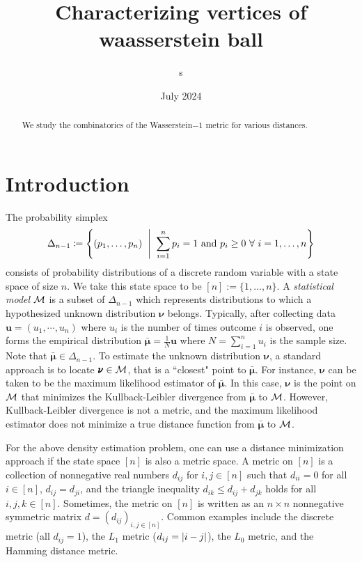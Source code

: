 

\usepackage[
backend=biber,
style=alphabetic,giveninits,
citestyle=ieee-alphabetic,
natbib=true,
uniquelist=false,
maxnames=10,
sorting=ynt
]{biblatex}
%


\title{Characterizing vertices of waasserstein ball}
\author{s}
\date{July 2024}



\begin{abstract}
We study the combinatorics of the Wasserstein$-1$ metric for various distances.
\end{abstract}
\maketitle

\section{Introduction}
The probability simplex 
$$ \Delta_{n-1}  \sett \set{(p_1, \ldots, p_n) \st \sum_{i=1}^n p_i = 1 \text{ and } p_i \geq 0 \fa i=1, \ldots,n }$$
consists of probability distributions of a discrete random variable with a state space of size $n$. We  take this state space to be $[n] := \{1, \ldots, n\}$. A {\it statistical model} ${\mathcal{M}}$ is a subset of $\Delta_{n-1}$ which represents distributions to which a hypothesized unknown distribution $\pmb\nu$ belongs. Typically, after collecting data $\pmb u=(u_1, \cdots, u_n)$ where $u_i$ is the number of times outcome $i$ is observed, one forms 
the empirical distribution $\bar{\pmb \mu} = \frac{1}{N} \pmb u$  where $ N = \sum\limits_{i=1}^n u_i$ is the sample size. Note that $\bar{\pmb \mu} \in \Delta_{n-1}$. To estimate the unknown distribution $\pmb \nu$, a standard approach is to locate $\pmb \nu \in {\mathcal{M}}$, that is a ``closest" point to $\bar {\pmb\mu}$. For instance, $\pmb\nu$ can be taken to be the maximum likelihood estimator \cite[Chapter 7]{sullivant2018algstat} of $\bar{\pmb \mu}$. In this case, $\pmb \nu$ is the point on ${\mathcal{M}}$ that minimizes the Kullback-Leibler divergence from $\bar{\pmb \mu}$ to ${\mathcal{M}}$. However, Kullback-Leibler divergence is not a metric, and the maximum likelihood estimator does not minimize a true distance function from $\bar{\pmb\mu}$ to ${\mathcal{M}}$.

For the above density estimation problem, one can use a distance minimization approach if the state space $[n]$ is also a metric space. A metric on $[n]$ is a collection of nonnegative real numbers $d_{ij}$ for $i,j \in [n]$ such that $d_{ii} = 0$ for all $i \in [n]$, $d_{ij} = d_{ji}$, and the triangle inequality $d_{ik} \leq d_{ij} + d_{jk}$ holds for all $i,j,k \in [n]$. Sometimes, the metric on $[n]$ is written as an $n\times n$ nonnegative symmetric matrix $d=(d_{ij})_{i,j\in [n]}$. Common examples include the discrete metric (all $d_{ij}=1$), the $L_1$ metric ($d_{ij} = \left| i-j \right|$), the $L_0$ metric, and the Hamming distance metric.

